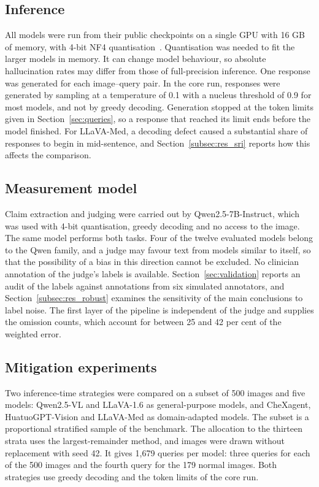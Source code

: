 \subsection{Inference}\label{sec:inference}
All models were run from their public checkpoints on a single GPU with 16 GB of memory, with 4-bit NF4 quantisation~\citep{dettmers2023qlora}. Quantisation was needed to fit the larger models in memory. It can change model behaviour, so absolute hallucination rates may differ from those of full-precision inference. One response was generated for each image--query pair. In the core run, responses were generated by sampling at a temperature of 0.1 with a nucleus threshold of 0.9 for most models, and not by greedy decoding. Generation stopped at the token limits given in Section~\ref{sec:queries}, so a response that reached its limit ends before the model finished.
For LLaVA-Med, a decoding defect caused a substantial share of responses to begin in mid-sentence, and Section~\ref{subsec:res_sri} reports how this affects the comparison.

\subsection{Measurement model}\label{sec:measurement}
Claim extraction and judging were carried out by Qwen2.5-7B-Instruct, which was used with 4-bit quantisation, greedy decoding and no access to the image. The same model performs both tasks. Four of the twelve evaluated models belong to the Qwen family, and a judge may favour text from models similar to itself, so that the possibility of a bias in this direction cannot be excluded. No clinician annotation of the judge's labels is available. Section~\ref{sec:validation} reports an audit of the labels against annotations from six simulated annotators, and Section~\ref{subsec:res_robust} examines the sensitivity of the main conclusions to label noise. The first layer of the pipeline is independent of the judge and supplies the omission counts, which account for between 25 and 42 per cent of the weighted error.

\subsection{Mitigation experiments}\label{sec:setup_mitigation}
Two inference-time strategies were compared on a subset of 500 images and five models: Qwen2.5-VL and LLaVA-1.6 as general-purpose models, and CheXagent, HuatuoGPT-Vision and LLaVA-Med as domain-adapted models. The subset is a proportional stratified sample of the benchmark. The allocation to the thirteen strata uses the largest-remainder method, and images were drawn without replacement with seed 42. It gives 1{,}679 queries per model: three queries for each of the 500 images and the fourth query for the 179 normal images. Both strategies use greedy decoding and the token limits of the core run.

